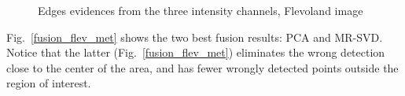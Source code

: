 \documentclass[journal]{IEEEtran}
\begin{document}
\begin{figure}[hbt]
	\centering
	\caption{Edges evidences from the three intensity channels, Flevoland image}
	\label{evidencias_flev_hh_hv_vv} 
\end{figure}

Fig.~\ref{fusion_flev_met} shows the two best fusion results: PCA and MR-SVD.
Notice that the latter (Fig.~\ref{fusion_flev_met}) eliminates the wrong detection close to the center of the area, and has fewer wrongly detected points outside the region of interest.
\end{document}
